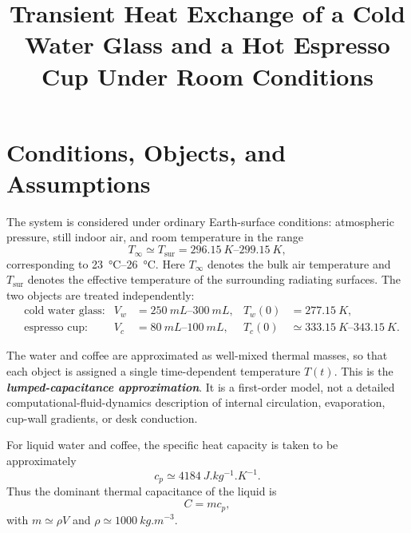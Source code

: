 \documentclass[11pt]{article}
\title{Transient Heat Exchange of a Cold Water Glass and a Hot Espresso Cup Under Room Conditions}
\author{}
\date{}
\begin{document}
\maketitle

\section{Conditions, Objects, and Assumptions}

The system is considered under ordinary Earth-surface conditions: atmospheric pressure, still indoor air, and room temperature in the range
\begin{equation}
    T_{\infty} \simeq T_{\mathrm{sur}} = \SIrange{296.15}{299.15}{K},
\end{equation}
corresponding to \SIrange{23}{26}{\degreeCelsius}. Here $T_{\infty}$ denotes the bulk air temperature and $T_{\mathrm{sur}}$ denotes the effective temperature of the surrounding radiating surfaces. The two objects are treated independently:
\begin{align}
    &\text{cold water glass:} & V_w &= \SIrange{250}{300}{mL}, & T_w(0) &= \SI{277.15}{K}, \\
    &\text{espresso cup:} & V_c &= \SIrange{80}{100}{mL}, & T_c(0) &\simeq \SIrange{333.15}{343.15}{K}.
\end{align}

The water and coffee are approximated as well-mixed thermal masses, so that each object is assigned a single time-dependent temperature $T(t)$. This is the \textbf{\textit{lumped-capacitance approximation}}. It is a first-order model, not a detailed computational-fluid-dynamics description of internal circulation, evaporation, cup-wall gradients, or desk conduction.

For liquid water and coffee, the specific heat capacity is taken to be approximately
\begin{equation}
    c_p \simeq \SI{4184}{J.kg^{-1}.K^{-1}}.
\end{equation}
Thus the dominant thermal capacitance of the liquid is
\begin{equation}
    C = mc_p,
\end{equation}
with $m \simeq \rho V$ and $\rho \simeq \SI{1000}{kg.m^{-3}}$.
\end{document}
